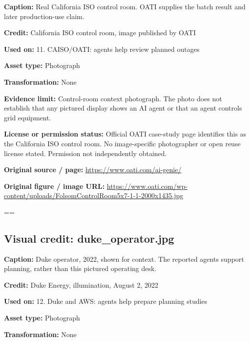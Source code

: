 \documentclass[10pt,letterpaper]{article}
\begin{document}
\textbf{Caption:} Real California ISO control room. OATI supplies the batch result and later production-use claim.\par
\textbf{Credit:} California ISO control room, image published by OATI\par
\textbf{Used on:} 11. CAISO/OATI: agents help review planned outages\par
\textbf{Asset type:} Photograph\par
\textbf{Transformation:} None\par
\textbf{Evidence limit:} Control-room context photograph. The photo does not establish that any pictured display shows an AI agent or that an agent controls grid equipment.\par
\textbf{License or permission status:} Official OATI case-study page identifies this as the California ISO control room. No image-specific photographer or open reuse license stated. Permission not independently obtained.\par
\textbf{Original source / page:} \href{https://www.oati.com/ai-genie/}{\small\ttfamily https:/\allowbreak{}/\allowbreak{}www.\allowbreak{}oati.\allowbreak{}com/\allowbreak{}ai-\allowbreak{}genie/\allowbreak{}}\par
\textbf{Original figure / image URL:} \href{https://www.oati.com/wp-content/uploads/FolsomControlRoom5x7-1-1-2000x1435.jpg}{\small\ttfamily https:/\allowbreak{}/\allowbreak{}www.\allowbreak{}oati.\allowbreak{}com/\allowbreak{}wp-\allowbreak{}content/\allowbreak{}uploads/\allowbreak{}FolsomControlRoom5x7-\allowbreak{}1-\allowbreak{}1-\allowbreak{}2000x1435.\allowbreak{}jpg}\par
\egroup\par\noindent\box\readingEntry\par\medskip
\setbox\readingEntry=\vbox\bgroup\hsize=\linewidth\subsection*{Visual credit: duke\_operator.jpg}
\textbf{Caption:} Duke operator, 2022, shown for context. The reported agents support planning, rather than this pictured operating desk.\par
\textbf{Credit:} Duke Energy, illumination, August 2, 2022\par
\textbf{Used on:} 12. Duke and AWS: agents help prepare planning studies\par
\textbf{Asset type:} Photograph\par
\textbf{Transformation:} None\par
\end{document}

